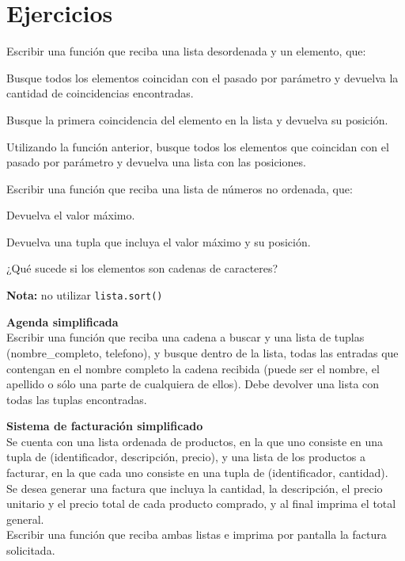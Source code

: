\newpage
\section{Ejercicios}

\begin{ejercicio}
Escribir una función que reciba una lista desordenada y un elemento, que:
\begin{partes}
\item Busque todos los elementos coincidan con el pasado por parámetro y
devuelva la cantidad de coincidencias encontradas.
\item Busque la primera coincidencia del elemento en la lista y devuelva su
posición.
\item Utilizando la función anterior, busque todos los elementos que coincidan
con el pasado por parámetro y devuelva una lista con las posiciones.
\end{partes}
\end{ejercicio}


\begin{ejercicio}
Escribir una función que reciba una lista de números no ordenada, que:
\begin{partes}
\item Devuelva el valor máximo.
\item Devuelva una tupla que incluya el valor máximo y su posición.
\item ¿Qué sucede si los elementos son cadenas de caracteres?
\end{partes}
{\bf Nota:} no utilizar \verb!lista.sort()!
\end{ejercicio}


\begin{ejercicio}
{\bf Agenda simplificada} \\
Escribir una función que reciba una cadena a buscar y una lista de tuplas
(nombre\_completo, telefono), y busque dentro de la lista, todas las
entradas que contengan en el nombre completo la cadena recibida (puede
ser el nombre, el apellido o sólo una parte de cualquiera de ellos).
Debe devolver una lista con todas las tuplas encontradas.
\end{ejercicio}


\begin{ejercicio}
{\bf Sistema de facturación simplificado} \\
Se cuenta con una lista ordenada de productos, en la que uno consiste en
una tupla de (identificador, descripción, precio), y una lista de los
productos a facturar, en la que cada uno consiste en una tupla de
(identificador, cantidad). \\
Se desea generar una factura que incluya la cantidad, la descripción, el
precio unitario y el precio total de cada producto comprado, y al final
imprima el total general. \\
Escribir una función que reciba ambas listas e imprima por
pantalla la factura solicitada.
\end{ejercicio}


